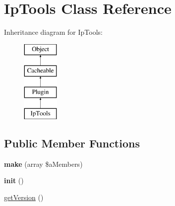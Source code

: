 \hypertarget{class_ip_tools}{\section{Ip\-Tools Class Reference}
\label{class_ip_tools}
}
Inheritance diagram for Ip\-Tools\-:\begin{figure}[H]
\begin{center}
\leavevmode
\includegraphics[height=4.000000cm]{class_ip_tools}
\end{center}
\end{figure}
\subsection*{Public Member Functions}
\begin{DoxyCompactItemize}
\item 
\hypertarget{class_ip_tools_a23486fdd4d175b93b0cb17c338a50b44}{{\bfseries make} (array \$a\-Members)}\label{class_ip_tools_a23486fdd4d175b93b0cb17c338a50b44}

\item 
\hypertarget{class_ip_tools_a94b27a53a8ed3fc79029312d1209e0d8}{{\bfseries init} ()}\label{class_ip_tools_a94b27a53a8ed3fc79029312d1209e0d8}

\item 
\hyperlink{class_ip_tools_a22e5f818fad091d1d25a286cb4897925}{get\-Version} ()
\end{DoxyCompactItemize}

